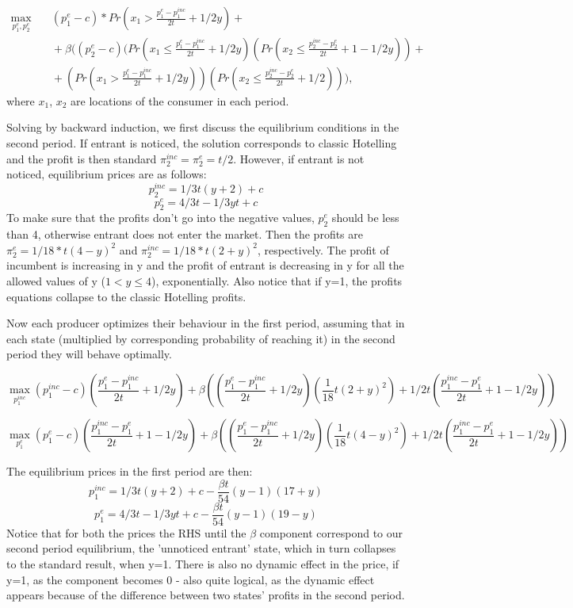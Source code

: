 \documentclass{article}
\begin{document}
    $$ \begin{aligned}
    \max_{p^{e}_1, p^{e}_2} {}
    & \quad (p^{e}_1-c)* Pr(x_1 > \frac{p^{e}_1-p^{inc}_1}{2t} + 1/2y) + \\
    & \quad + \beta((p^{e}_2-c)(Pr(x_1 \leq \frac{p^{e}_1-p^{inc}_1}{2t} + 1/2y)(Pr(x_2 \leq \frac{p^{inc}_2-p^{e}_2}{2t} + 1 - 1/2y)) + \\
    & \quad + (Pr(x_1 > \frac{p^{e}_1-p^{inc}_1}{2t} + 1/2y))(Pr(x_2 \leq \frac{p^{inc}_2-p^{e}_2}{2t} + 1/2))),
    \end{aligned}
    $$
where $x_1$, $x_2$ are locations of the consumer in each period. 

    
Solving by backward induction, we first discuss the equilibrium conditions in the second period. 
If entrant is noticed, the solution corresponds to classic Hotelling and the profit is then standard $\pi_{2}^{inc} = \pi_{2}^{e}= t/2$. However, if entrant is not noticed, equilibrium prices are as follows:
$$
p^{inc}_2 =1/3t(y+ 2) + c $$
$$ p^{e}_2 =4/3t - 1/3yt + c$$
To make sure that the profits don't go into the negative values, $ p^{e}_2$ should be less than 4, otherwise entrant does not enter the market. Then the profits are $\pi_{2}^{e} = 1/18*t(4-y)^2$ and $\pi_{2}^{inc}=1/18*t(2+y)^2$, respectively. The profit of incumbent is increasing in y and the profit of entrant is decreasing in y for all the allowed values of y ($1<y\leq4$), exponentially. Also notice that if y=1, the profits equations collapse to the classic Hotelling profits. 

Now each producer optimizes their behaviour in the first period, assuming that in each state (multiplied by corresponding probability of reaching it) in the second period they will behave optimally. 

	


 $$
    \max_{p^{inc}_1} {}
   (p^{inc}_1-c)(\frac{p^{e}_1-p^{inc}_1}{2t} + 1/2y) 
    + \beta((\frac{p^{e}_1-p^{inc}_1}{2t} + 1/2y)(\frac{1}{18}t(2+y)^2) + 
    1/2t(\frac{p^{inc}_1-p^{e}_1}{2t} + 1 - 1/2y))
    $$
    
    $$
   \max_{p^{e}_1} {}
   (p^{e}_1-c)(\frac{p^{inc}_1-p^{e}_1}{2t} + 1 -1/2y) 
    + \beta((\frac{p^{e}_1-p^{inc}_1}{2t} + 1/2y)(\frac{1}{18}t(4-y)^2) + 
    1/2t(\frac{p^{inc}_1-p^{e}_1}{2t} + 1 - 1/2y))
    $$

The equilibrium prices in the first period are then:
$$
p^{inc}_1 =1/3t(y+ 2) + c - \frac{\beta t }{54}(y-1)(17+y) $$
$$ p^{e}_1 =4/3t - 1/3yt + c - \frac{\beta t}{54}(y-1)(19-y)$$
Notice that for both the prices the RHS until the $ \beta$ component correspond to our second period equilibrium, the 'unnoticed entrant' state, which in turn collapses to the standard result, when y=1. There is also no dynamic effect in the price, if y=1, as the component becomes 0 - also quite logical, as the dynamic effect appears because of the difference between two states' profits in the second period. 
\end{document}
